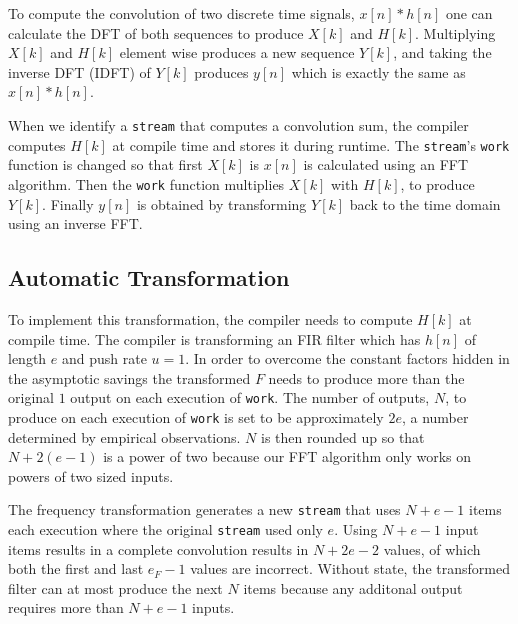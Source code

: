 
To compute the convolution of two discrete time signals, $x[n]*h[n]$ 
one can calculate the DFT of both sequences to produce 
$X[k]$ and $H[k]$. Multiplying $X[k]$ and $H[k]$ element wise
produces a new sequence $Y[k]$, and taking the inverse DFT (IDFT) of $Y[k]$ 
produces $y[n]$ which is exactly the same as $x[n]*h[n]$.

When we identify a {\tt stream} that computes a convolution sum, the
compiler computes $H[k]$ at compile time and stores it during runtime. 
The {\tt stream}'s {\tt work} function is changed so that first $X[k]$ is 
$x[n]$ is calculated using an FFT algorithm. Then the {\tt work} function 
multiplies $X[k]$ with $H[k]$, to produce $Y[k]$. Finally $y[n]$ is obtained by
transforming $Y[k]$ back to the time domain using an inverse FFT.

\subsection{Automatic Transformation}

To implement this transformation, the compiler needs to compute $H[k]$ at
compile time. The compiler is transforming an FIR filter which has $h[n]$ of length $e$
and push rate $u=1$.
In order to overcome the constant factors hidden in the asymptotic savings
the transformed $F$ needs to produce more than the original $1$ output on each
execution of {\tt work}. The number of outputs, $N$, to produce on each 
execution of {\tt work} is set to be approximately $2e$, a number determined
by empirical observations. $N$ is then rounded up so that $N+2(e-1)$ is a power of two 
because our FFT algorithm only works on powers of two sized inputs. 

The frequency transformation generates a new {\tt stream} that
uses $N+e-1$ items each execution where the original {\tt stream} used only $e$.
Using $N+e-1$ input items results in a complete convolution results in 
$N+2e-2$ values, of which both the first and last $e_F-1$ values 
are incorrect. Without state, the transformed filter can at most produce 
the next $N$ items because any additonal output requires more than $N+e-1$ inputs.

